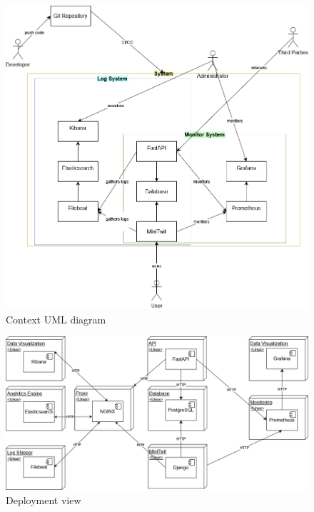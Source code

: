 \documentclass{article}
\begin{document}
        \begin{figure}[H]
            \includegraphics[width=13cm]{images/Context.png}
            \centering
            \caption{Context UML diagram}
            \label{fig:Context}
        \end{figure}
        \begin{figure}[H]
            \includegraphics[width=13cm]{images/Deployment.png}
            \centering
            \caption{Deployment view}
            \label{fig:Deployment}
        \end{figure}
\end{document}
